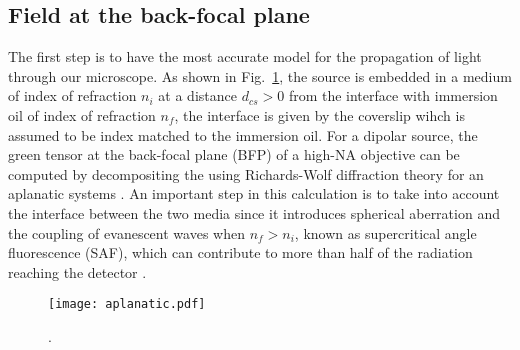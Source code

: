 \documentclass[reprint,aps,pra,superscriptaddress,
amsmath,amssymb]{revtex4-1}
\begin{document}
\subsection{Field at the back-focal plane}

The first step is to have the most accurate model for the propagation 
of light through our microscope. As shown in Fig.~\ref{fig:aplanatic}, 
the source is embedded in a medium of index of refraction $n_i$ at a 
distance $d_{cs}>0$ from the interface with immersion oil of index of 
refraction $n_f$, the interface is given by the coverslip wihch is assumed
to be index matched to the immersion oil. For a dipolar source, the green 
tensor at the back-focal plane (BFP) of a high-NA objective can be 
computed by decompositing the using Richards-Wolf diffraction 
theory for an aplanatic systems \cite{richards1959electromagnetic,
novotny2006principles}. An important step in this calculation is to  
take into account the interface between the two media since it introduces 
spherical aberration and the coupling of evanescent waves when $n_f > n_i$,
known as supercritical angle fluorescence (SAF), 
which  can contribute to more than 
half of the radiation reaching the detector \cite{hellen1987fluorescence,
axelrod2001total,axelrod2013evanescent}.

\begin{figure}
  \centering
  \texttt{[image: aplanatic.pdf]}
  \caption{\label{fig:aplanatic} . }
  \end{figure}
\end{document}
